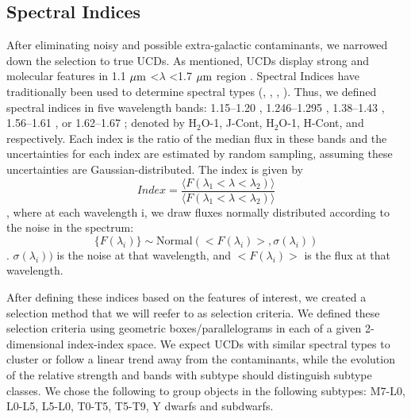 \documentclass[manuscript]{aastex63}
\begin{document}
\subsection{Spectral Indices}
After eliminating noisy and possible extra-galactic contaminants, we narrowed down the selection to true UCDs. As mentioned, UCDs display strong \meth and \wat molecular features in 1.1 $\mbox{$\mu$m}$ \textless $\lambda$ \textless 1.7 $\mbox{$\mu$m}$ region \citep{2001PhDT.......116B}. Spectral Indices have traditionally been used to determine spectral types (\citealt{1999AJ....117.1010T}, \citealt{2000AJ....119.3019C}, \citealt{2007ApJ...657..511A}, \citealt{2007ApJ...658..557B}). Thus, we defined  spectral indices in five wavelength bands: 1.15--1.20 \micron, 1.246--1.295 \micron, 1.38--1.43 \micron,  1.56--1.61 \micron, or 1.62--1.67 \micron; denoted by H$_2$O-1, J-Cont, H$_2$O-1, H-Cont, and \meth respectively. Each index is the ratio of the median flux in these bands and the uncertainties for each index are estimated by random sampling, assuming these uncertainties are Gaussian-distributed. The index is
 given by \begin{equation} Index=\frac{ \langle  F(\lambda_1<\lambda < \lambda_2) \rangle }{  \langle F(\lambda_1 < \lambda <\lambda_2) \rangle }\end{equation}, where at each wavelength i, we draw fluxes normally distributed according to the noise in the spectrum: \begin{equation} \{F(\lambda _i)\} \sim \text{Normal} (<F(\lambda_i)>, \sigma(\lambda_i )) \end{equation}. $\sigma(\lambda_i ))$ is the noise at that wavelength, and $<F(\lambda_i )>$ is the flux at that wavelength.

After defining these indices based on the features of interest, we created a selection method that we will reefer to as selection criteria. We defined these selection criteria using geometric boxes/parallelograms in each of a given 2-dimensional index-index space. We expect UCDs with similar spectral types to cluster or follow a linear trend away from the contaminants, while the evolution of the relative strength \wat and \meth bands with subtype should distinguish subtype classes. We chose the following to group objects in the following subtypes: M7-L0, L0-L5, L5-L0, T0-T5, T5-T9, Y dwarfs and subdwarfs. 
\end{document}

